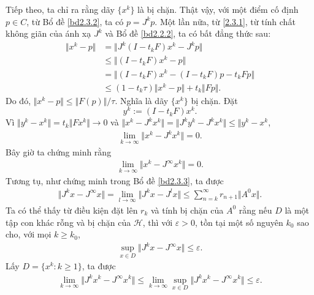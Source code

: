 \documentclass[14pt, oneside,A4paper]{book}
\theoremstyle{plain}
\begin{document}
Tiếp theo, ta chỉ ra rằng dãy $\lbrace x^{k} \rbrace$ là bị chặn. Thật vậy, với một điểm cố định $p \in C$, từ Bổ đề \ref{bd2.3.2}, ta có $p=J^{k}p$. Một lần nữa, từ \eqref{2.3.1}, từ tính chất không giãn của ánh xạ $J^{k}$ và Bổ đề \ref{bd2.2.2}, ta có bất đẳng thức sau:
\begin{align*}
\Vert x^{k}-p \Vert &= \Vert J^{k}(I-t_{k}F)x^{k} - J^{k}p \Vert \\
& \leq \Vert (I-t_{k}F)x^{k}-p \Vert \\
& = \Vert (I-t_{k}F)x^{k}-(I-t_{k}F)p - t_{k}Fp \Vert \\
& \leq (1-t_{k}\tau)\Vert x^{k}-p\Vert + t_{k} \Vert Fp \Vert .
\end{align*}
Do đó, $\Vert x^{k}-p \Vert \leq \Vert F(p) \Vert / \tau$. Nghĩa là dãy $\lbrace x^{k} \rbrace$ bị chặn. Đặt $$y^{k}:=(I-t_{k}F)x^{k}.$$ Vì $\Vert y^{k}-x^{k} \Vert = t_{k}\Vert Fx^{k} \Vert \rightarrow 0$ và $\Vert x^{k}-J^{k}x^{k} \Vert = \Vert J^{k}y^{k}-J^{k}x^{k} \Vert \leq \Vert y^{k}-x^{k}$,
\begin{align} \label{2.3.3}
\lim_{k \rightarrow \infty} \Vert x^{k}-J^{k}x^{k} \Vert =0.
\end{align}
Bây giờ ta chứng minh rằng 
\begin{align} \label{2.3.4}
\lim_{k \rightarrow \infty} \Vert x^{k}-J^{\infty}x^{k} \Vert =0.
\end{align}
Tương tụ, như chứng minh trong Bổ đề \ref{bd2.3.3}, ta được
\begin{align*}
\Vert J^{k}x-J^{\infty}x \Vert = \lim_{l \rightarrow \infty} \Vert J^{k}x-J^{l}x \Vert \leq \sum_{n=k}^{\infty}r_{n+1}\Vert A^{0}x \Vert.
\end{align*}
Ta có thể thấy từ điều kiện đặt lên $r_{k}$ và tính bị chặn của $A^{0}$ rằng nếu $D$ là một tập con khác rỗng và bị chặn của $\mathcal H$, thì với $\varepsilon  > 0$, tồn tại một số nguyên $k_{0}$ sao cho, với mọi $k \geq k_{0}$,
\begin{align*}
\sup_{x \in D} \Vert J^{k}x-J^{\infty}x \Vert \leq \varepsilon .
\end{align*}
Lấy $D = \lbrace x^{k}:k\geq 1 \rbrace$, ta được
\begin{align*}
\lim_{k\rightarrow \infty} \Vert J^{k}x^{k}-J^{\infty}x^{k} \Vert \leq \lim_{k\rightarrow \infty} \sup_{x \in D} \Vert J^{k}x^{k}-J^{\infty}x^{k} \Vert \leq \varepsilon .
\end{align*}
\end{document}
